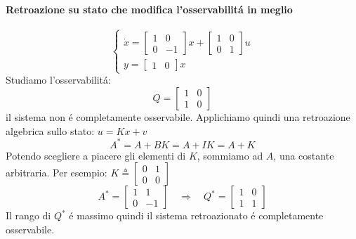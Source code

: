 \documentclass[../main.tex]{subfiles}
\begin{document}
		\begin{mdframed}[style=Esempio]
			\paragraph{Retroazione su stato che modifica l'osservabilit\'a in meglio}
			\[
				\begin{cases}
					\dot x =
					\begin{bmatrix}
						1 & 0\\
						0 & -1
					\end{bmatrix} x+
					\begin{bmatrix}
						1 & 0\\
						0 & 1
					\end{bmatrix} u
					\\[1em]
					y = 
					\begin{bmatrix}
						1 & 0
					\end{bmatrix} x
				\end{cases}
			\]
			Studiamo l'osservabilit\'a:
			\[
				Q = 
				\begin{bmatrix}
					1 & 0\\
					1 & 0
				\end{bmatrix}
			\]
			il sistema non \'e completamente osservabile. Applichiamo quindi una retroazione algebrica sullo stato: $ u = Kx + v $
			\[
				A^{*} = A+BK = A+IK = A + K
			\]
			Potendo scegliere a piacere gli elementi di $ K $, sommiamo ad $ A $, una costante arbitraria. Per esempio: $ K \triangleq \begin{bmatrix} 0 & 1\\ 0 & 0 \end{bmatrix} $
			\[
				A^{*} = 
				\begin{bmatrix}
					1 & 1\\
					0 & -1
				\end{bmatrix}
				\quad\Rightarrow\quad
				Q^{*} =
				\begin{bmatrix}
					1 & 0\\
					1 & 1
				\end{bmatrix}
			\]
			Il rango di $ Q^{*} $ \'e massimo quindi il sistema retroazionato \'e completamente osservabile.
		\end{mdframed}
	
\end{document}
